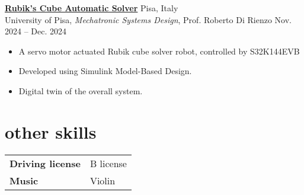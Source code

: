 \documentclass[10pt]{article}
\newcommand{\entry}[4]{{{\textbf{#1}}} \hfill #3 \\ #2 \hfill #4}
\begin{document}
\entry{\href{https://github.com/leonardobove/rubiks_cube_automatic_solver/tree/main}{Rubik's Cube Automatic Solver}}{University of Pisa, \textit{Mechatronic Systems Design}, Prof. Roberto Di Rienzo}{Pisa, Italy}{Nov. 2024 -- Dec. 2024}
\begin{itemize}[noitemsep,leftmargin=3.5mm,rightmargin=0mm,topsep=6pt]
    \item A servo motor actuated Rubik cube solver robot, controlled by S32K144EVB
    \item Developed using Simulink Model-Based Design.
    \item Digital twin of the overall system.
\end{itemize}

\section{other skills}
\begin{tabular}{l l}
    \textbf{Driving license}& B license\\
    \textbf{Music}& Violin\\
\end{tabular}
\vspace*{\fill}
\end{document}
